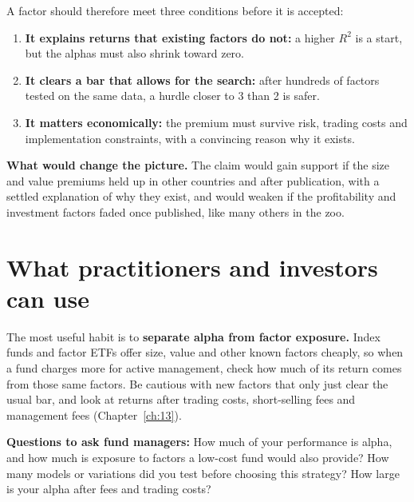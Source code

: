 A factor should therefore meet three conditions before it is accepted:

\begin{enumerate}
  \item \textbf{It explains returns that existing factors do not:} a higher $R^2$ is a start, but the alphas must also shrink toward zero.
  \item \textbf{It clears a bar that allows for the search:} after hundreds of factors tested on the same data, a hurdle closer to 3 than 2 is safer.
  \item \textbf{It matters economically:} the premium must survive risk, trading costs and implementation constraints, with a convincing reason why it exists.
\end{enumerate}

\textbf{What would change the picture.} The claim would gain support if the size and value premiums held up in other countries and after publication, with a settled explanation of why they exist, and would weaken if the profitability and investment factors faded once published, like many others in the zoo.

\section{What practitioners and investors can use}
\label{sec:04-investors}

The most useful habit is to \textbf{separate alpha from factor exposure.} Index funds and factor ETFs offer size, value and other known factors cheaply, so when a fund charges more for active management, check how much of its return comes from those same factors. Be cautious with new factors that only just clear the usual bar, and look at returns after trading costs, short-selling fees and management fees (Chapter~\ref{ch:13}).

\textbf{Questions to ask fund managers:} How much of your performance is alpha, and how much is exposure to factors a low-cost fund would also provide? How many models or variations did you test before choosing this strategy? How large is your alpha after fees and trading costs?

